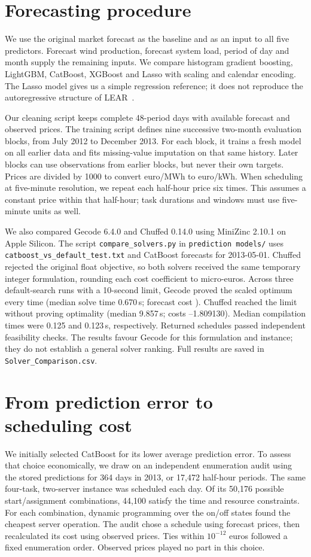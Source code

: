 \documentclass[10pt,a4paper,twocolumn]{article}
\newcommand{\code}[1]{\texttt{#1}}
\begin{document}
\section{Forecasting procedure}
We use the original market forecast as the baseline and as an input to all five predictors. Forecast wind production, forecast system load, period of day and month supply the remaining inputs. We compare histogram gradient boosting, LightGBM, CatBoost, XGBoost and Lasso with scaling and calendar encoding. The Lasso model gives us a simple regression reference; it does not reproduce the autoregressive structure of LEAR~\cite{lago}.

Our cleaning script keeps complete 48-period days with available forecast and observed prices. The training script defines nine successive two-month evaluation blocks, from July 2012 to December 2013. For each block, it trains a fresh model on all earlier data and fits missing-value imputation on that same history. Later blocks can use observations from earlier blocks, but never their own targets. Prices are divided by 1000 to convert euro/MWh to euro/kWh. When scheduling at five-minute resolution, we repeat each half-hour price six times. This assumes a constant price within that half-hour; task durations and windows must use five-minute units as well.

We also compared Gecode 6.4.0 and Chuffed 0.14.0 using MiniZinc 2.10.1 on Apple Silicon. The script \code{compare\_solvers.py} in \code{prediction models/} uses \code{catboost\_vs\_default\_test.txt} and CatBoost forecasts for 2013-05-01. Chuffed rejected the original float objective, so both solvers received the same temporary integer formulation, rounding each cost coefficient to micro-euros. Across three default-search runs with a 10-second limit, Gecode proved the scaled optimum every time (median solve time 0.670\,s; forecast cost ). Chuffed reached the limit without proving optimality (median 9.857\,s; costs --1.809130). Median compilation times were 0.125 and 0.123\,s, respectively. Returned schedules passed independent feasibility checks. The results favour Gecode for this formulation and instance; they do not establish a general solver ranking. Full results are saved in \code{Solver\_Comparison.csv}.

\section{From prediction error to scheduling cost}
We initially selected CatBoost for its lower average prediction error. To assess that choice economically, we draw on an independent enumeration audit using the stored predictions for 364 days in 2013, or 17,472 half-hour periods. The same four-task, two-server instance was scheduled each day. Of its 50,176 possible start/assignment combinations, 44,100 satisfy the time and resource constraints. For each combination, dynamic programming over the on/off states found the cheapest server operation. The audit chose a schedule using forecast prices, then recalculated its cost using observed prices. Ties within $10^{-12}$ euros followed a fixed enumeration order. Observed prices played no part in this choice.
\end{document}

